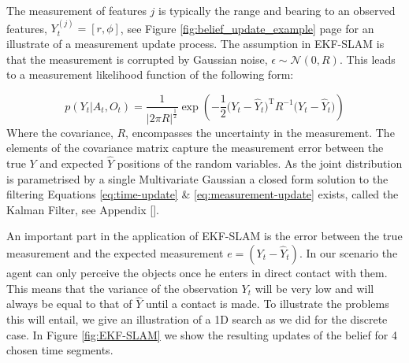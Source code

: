 The measurement of features $j$ is typically the range and bearing to an observed features, $Y^{(j)}_t = [r,\phi]$,
see Figure \ref{fig:belief_update_example} page \pageref{fig:belief_update_example} for an illustrate of a measurement update process.
The assumption in EKF-SLAM is that the measurement is corrupted by Gaussian noise, $\epsilon \sim \mathcal{N}(0,R)$.
This leads to a measurement likelihood function of the following form:

\begin{equation} \label{eq:lik-measurement}
   p(Y_t|A_t,O_t) = \frac{1}{|2\pi R|^{\frac{1}{2}}} \exp \left( -\frac{1}{2} \big(Y_t - \hat{Y}_t\big)^{\mathrm{T}}R^{-1}\big(Y_t - \hat{Y}_t\big) \right)
\end{equation}
Where the covariance, $R$, encompasses the uncertainty in the measurement. The elements of the covariance matrix capture 
the measurement error between the true $Y$ and expected $\hat{Y}$ positions of the random variables. As the joint distribution 
is parametrised by a single Multivariate Gaussian a closed form solution to the filtering Equations \ref{eq:time-update} \& \ref{eq:measurement-update} 
exists, called the Kalman Filter, see Appendix []. 

An important part in the application of EKF-SLAM is the error between the true measurement and the expected measurement 
$e = (Y_t - \hat{Y}_t)$. In our scenario the agent can only perceive the objects once he enters in direct contact with them. 
This means that the variance of the observation $Y_t$ will be very low and will always be equal to that of $\hat{Y}$ until a contact is made. To illustrate the problems this will
entail, we give an illustration of a 1D search as we did for the discrete case. In Figure \ref{fig:EKF-SLAM} we show the resulting updates of the belief 
for 4 chosen time segments.

